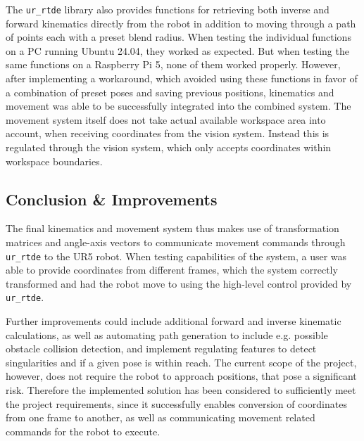 The \texttt{ur\_rtde} library also provides functions for retrieving both inverse and forward kinematics directly from the robot in addition to moving through a path of points each with a preset blend radius. When testing the individual functions on a PC running Ubuntu 24.04, they worked as expected. But when testing the same functions on a Raspberry Pi 5, none of them worked properly. However, after implementing a workaround, which avoided using these functions in favor of a combination of preset poses and saving previous positions, kinematics and movement was able to be successfully integrated into the combined system.
The movement system itself does not take actual available workspace area into account, when receiving coordinates from the vision system. Instead this is regulated through the vision system, which only accepts coordinates within workspace boundaries.

\subsection{Conclusion \& Improvements}
The final kinematics and movement system thus makes use of transformation matrices and angle-axis vectors to communicate movement commands through \texttt{ur\_rtde} to the UR5 robot. When testing capabilities of the system, a user was able to provide coordinates from different frames, which the system correctly transformed and had the robot move to using the high-level control provided by \texttt{ur\_rtde}.

Further improvements could include additional forward and inverse kinematic calculations, as well as automating path generation to include e.g. possible obstacle collision detection, and implement regulating features to detect singularities and if a given pose is within reach.
The current scope of the project, however, does not require the robot to approach positions, that pose a significant risk. Therefore the implemented solution has been considered to sufficiently meet the project requirements, since it successfully enables conversion of coordinates from one frame to another, as well as communicating movement related commands for the robot to execute.